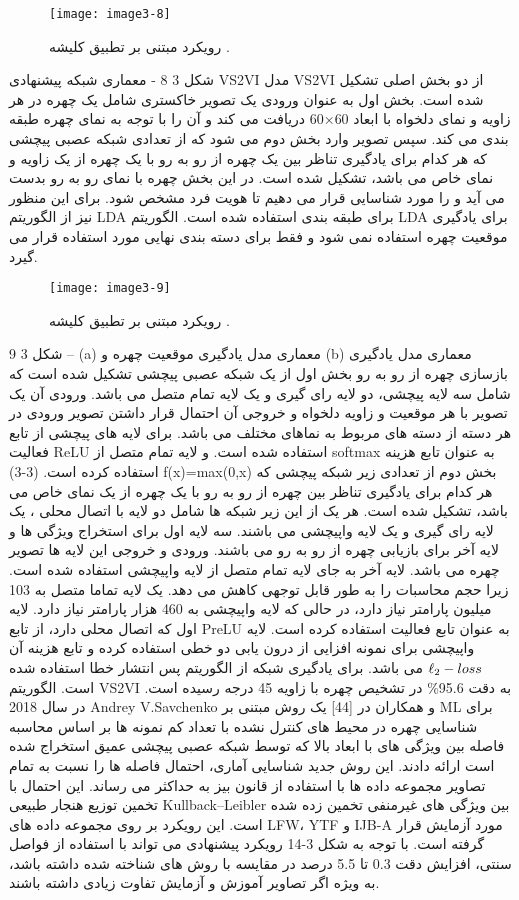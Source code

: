  \begin{figure}[h]
\centering
  \texttt{[image: image3-8]}
  \caption{رویکرد مبتنی بر تطبیق کلیشه  \cite{ref1}.}
  \label{image2-1}
\end{figure}
شکل ‏3 8 - معماری شبکه پیشنهادی VS2VI
مدل VS2VI از دو بخش اصلی تشکیل شده است. بخش اول به عنوان ورودی یک تصویر خاکستری  شامل یک چهره در هر زاویه و نمای دلخواه با ابعاد 60×60 دریافت می کند و آن را با توجه به نمای چهره طبقه بندی  می کند. سپس تصویر وارد بخش دوم می شود که از تعدادی شبکه عصبی پیچشی که هر کدام برای یادگیری تناظر  بین یک چهره از رو به رو با یک چهره از یک زاویه و نمای خاص می باشد، تشکیل شده است. در این بخش چهره با نمای رو به رو بدست می آید و را مورد شناسایی قرار می دهیم تا هویت فرد مشخص شود. برای این منظور نیز از الگوریتم LDA  برای طبقه بندی استفاده شده است. الگوریتم LDA برای یادگیری موقعیت چهره استفاده نمی شود و فقط برای دسته بندی نهایی مورد استفاده قرار می گیرد.
 \begin{figure}[h]
\centering
  \texttt{[image: image3-9]}
  \caption{رویکرد مبتنی بر تطبیق کلیشه  \cite{ref1}.}
  \label{image2-1}
\end{figure}
شکل ‏3 9 – (a) معماری مدل یادگیری موقعیت چهره و (b) معماری مدل یادگیری بازسازی چهره از رو به رو
بخش اول از یک شبکه عصبی پیچشی تشکیل شده است که شامل سه لایه پیچشی، دو لایه رای گیری و یک لایه تمام متصل می باشد. ورودی آن یک تصویر با هر موقعیت و زاویه دلخواه و خروجی آن احتمال قرار داشتن تصویر ورودی در هر دسته از دسته های مربوط به نماهای مختلف می باشد. برای لایه های پیچشی از تابع فعالیت ReLU استفاده شده است. و لایه تمام متصل از softmax به عنوان تابع هزینه استفاده کرده است.
(3-3)	f(x)=max(0,x)	
بخش دوم از تعدادی زیر شبکه پیچشی که هر کدام برای یادگیری تناظر  بین چهره از رو به رو با یک چهره از یک نمای خاص می باشد، تشکیل شده است. هر یک از این زیر شبکه ها شامل دو لایه با اتصال محلی ، یک لایه رای گیری و یک لایه واپیچشی می باشند. سه لایه اول برای استخراج ویژگی ها و لایه آخر برای بازیابی چهره از رو به رو می باشند. ورودی و خروجی این لایه ها تصویر چهره می باشد.
لایه آخر به جای لایه تمام متصل از لایه واپیچشی استفاده شده است. زیرا حجم محاسبات را به طور قابل توجهی کاهش می دهد. یک لایه تماما متصل به 103 میلیون پارامتر نیاز دارد، در حالی که لایه واپیچشی به 460 هزار پارامتر نیاز دارد. لایه اول که اتصال محلی دارد،  از تابع PreLU به عنوان تابع فعالیت استفاده کرده است. لایه واپیچشی برای نمونه افزایی از درون یابی دو خطی استفاده کرده و تابع هزینه آن
$\ell\textsubscript{2}-loss$
می باشد. برای یادگیری شبکه از الگوریتم پس انتشار خطا  استفاده شده است. الگوریتم VS2VI به دقت 95.6\% در تشخیص چهره با زاویه 45 درجه رسیده است.
در سال 2018 Andrey V.Savchenko و همکاران در [44] یک روش مبتنی بر ML  برای شناسایی چهره در محیط های کنترل نشده با تعداد کم نمونه ها بر اساس محاسبه فاصله بین ویژگی های با ابعاد بالا که توسط شبکه عصبی پیچشی عمیق استخراج شده است ارائه دادند. این روش جدید شناسایی آماری، احتمال فاصله ها را نسبت به تمام تصاویر مجموعه داده ها با استفاده از قانون بیز  به حداکثر می رساند. این احتمال با تخمین توزیع هنجار طبیعی Kullback–Leibler بین ویژگی های غیرمنفی تخمین زده شده است. این رویکرد بر روی مجموعه داده های LFW، YTF  و IJB-A  مورد آزمایش قرار گرفته است. با توجه به شکل 3-14 رویکرد پیشنهادی می تواند با استفاده از فواصل سنتی، افزایش دقت 0.3 تا 5.5 درصد در مقایسه با روش های شناخته شده داشته باشد، به ویژه اگر تصاویر آموزش و آزمایش تفاوت زیادی داشته باشند. 
